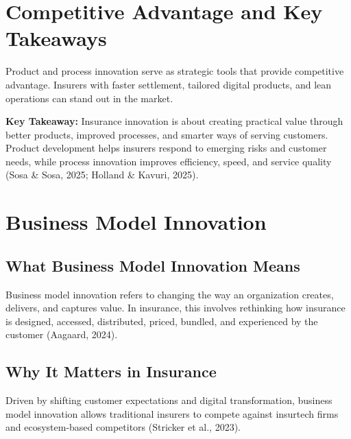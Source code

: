 \documentclass[12pt,a4paper]{article}
\begin{document}
\section{Competitive Advantage and Key Takeaways}

Product and process innovation serve as strategic tools that provide competitive advantage. Insurers with faster settlement, tailored digital products, and lean operations can stand out in the market.

\begin{example}
\textbf{Key Takeaway:} Insurance innovation is about creating practical value through better products, improved processes, and smarter ways of serving customers. Product development helps insurers respond to emerging risks and customer needs, while process innovation improves efficiency, speed, and service quality (Sosa \& Sosa, 2025; Holland \& Kavuri, 2025).
\end{example}

\section{Business Model Innovation}

\subsection{What Business Model Innovation Means}
Business model innovation refers to changing the way an organization creates, delivers, and captures value. In insurance, this involves rethinking how insurance is designed, accessed, distributed, priced, bundled, and experienced by the customer (Aagaard, 2024).

\subsection{Why It Matters in Insurance}
Driven by shifting customer expectations and digital transformation, business model innovation allows traditional insurers to compete against insurtech firms and ecosystem-based competitors (Stricker et al., 2023).
\end{document}
